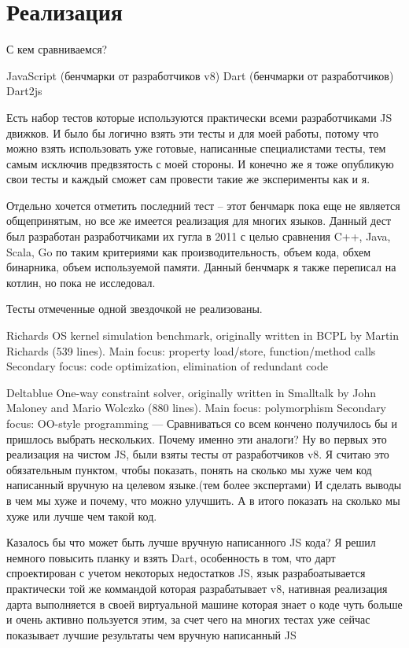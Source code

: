 \chapter{Реализация}

С кем сравниваемся?

JavaScript (бенчмарки от разработчиков v8)
Dart (бенчмарки от разработчиков)
Dart2js


Есть набор тестов которые используются практически всеми разработчиками JS движков. И было бы логично взять эти тесты и для моей работы, потому что можно взять использовать уже готовые, написанные специалистами тесты, тем самым исключив предвзятость с моей стороны. И конечно же я тоже опубликую свои тесты и каждый сможет сам провести такие же эксперименты как и я.

Отдельно хочется отметить последний тест -- этот бенчмарк пока еще не является общепринятым, но все же имеется реализация для многих языков. Данный дест был разработан разработчиками их гугла в 2011 с целью сравнения C++, Java, Scala, Go по таким критериями как производительность, объем кода, обхем бинарника, объем используемой памяти. 
Данный бенчмарк я также переписал на котлин, но пока не исследовал.

Тесты отмеченные одной звездочкой не реализованы.

Richards
OS kernel simulation benchmark, originally written in BCPL by Martin Richards (539 lines).
Main focus: property load/store, function/method calls
Secondary focus: code optimization, elimination of redundant code

Deltablue
One-way constraint solver, originally written in Smalltalk by John Maloney and Mario Wolczko (880 lines).
Main focus: polymorphism
Secondary focus: OO-style programming
---
Сравниваться со всем кончено получилось бы и пришлось выбрать нескольких.
Почему именно эти аналоги?
Ну во первых это реализация на чистом JS, были взяты тесты от разработчиков v8. Я считаю это обязательным пунктом, чтобы показать, понять на сколько мы хуже чем код написанный вручную на целевом языке.(тем более экспертами) И сделать выводы в чем мы хуже и почему, что можно улучшить. А в итого показать на сколько мы хуже или лучше чем такой код.

Казалось бы что может быть лучше вручную написанного JS кода? Я решил немного повысить планку и взять Dart, особенность в том, что дарт спроектирован с учетом некоторых недостатков JS, язык разрабоатывается практически той же коммандой которая разрабатывает v8, нативная реализация дарта выполняется в своей виртуальной машине которая знает о коде чуть больше и очень активно пользуется этим, за счет чего на многих тестах уже сейчас показывает лучшие результаты чем вручную написанный JS

